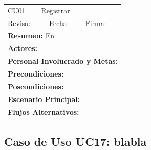 \begin{longtable}{|l|p{5.5cm}|l|p{2cm}|l|p{1.9cm}|} \hline
    \cellcolor{grisOscuro} CU01 & \multicolumn{4}{|l|}{  \cellcolor{grisOscuro} Registrar} &  \cellcolor{grisClaro}\multirow{2}{1cm}{} \\ \cline{1-5}
    \cellcolor{grisOscuro} Revisa: &  \cellcolor{grisClaro} &  \cellcolor{grisOscuro} Fecha &  \cellcolor{grisClaro} &  \cellcolor{grisOscuro} Firma: & \cellcolor{grisClaro} \\ \hline
    \multicolumn{6}{|p{15cm}|}{ \textbf{Resumen: } En

    } \\ \hline

    \multicolumn{6}{|p{15cm}|}{ \textbf{Actores: }

    } \\ \hline

    \multicolumn{6}{|p{15cm}|}{ \textbf{Personal Involucrado y Metas: }

    } \\ \hline

    \multicolumn{6}{|p{15cm}|}{ \textbf{Precondiciones: }

    } \\ \hline

    \multicolumn{6}{|p{15cm}|}{ \textbf{Poscondiciones: }

    } \\ \hline

    \multicolumn{6}{|p{15cm}|}{ \textbf{Escenario Principal: }

    } \\ \hline

    \multicolumn{6}{|p{15cm}|}{ \textbf{Flujos Alternativos: }

    } \\ \hline

\end{longtable}


\subsection{Caso de Uso UC17: blabla}

